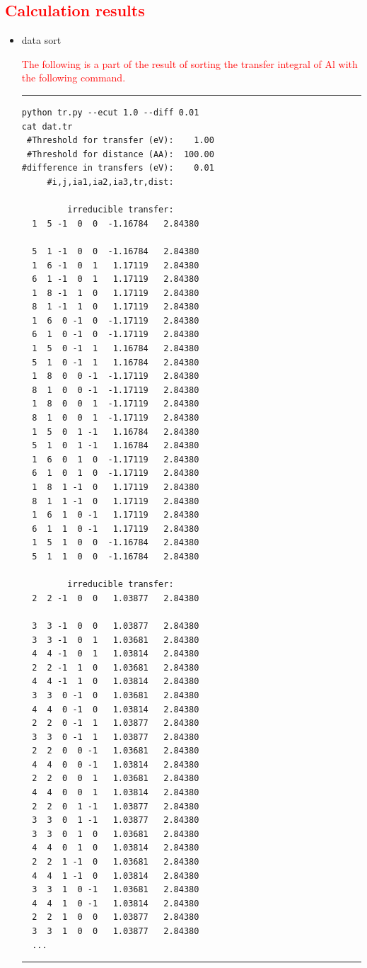 \documentclass{article}
\newcommand{\tr}[1]{\textcolor{red}{#1}}
\begin{document}
\subsection{\label{command}\tr{Calculation results}}

\begin{itemize}
\item{data sort}

\tr{The following is a part of the result of sorting the transfer integral of Al with the following command.}
\vspace{3mm}\hrule
\begin{multicols}{2}
\begin{verbatim}
python tr.py --ecut 1.0 --diff 0.01
cat dat.tr 
 #Threshold for transfer (eV):    1.00
 #Threshold for distance (AA):  100.00
#difference in transfers (eV):    0.01
     #i,j,ia1,ia2,ia3,tr,dist:

         irreducible transfer:
  1  5 -1  0  0  -1.16784   2.84380

  5  1 -1  0  0  -1.16784   2.84380
  1  6 -1  0  1   1.17119   2.84380
  6  1 -1  0  1   1.17119   2.84380
  1  8 -1  1  0   1.17119   2.84380
  8  1 -1  1  0   1.17119   2.84380
  1  6  0 -1  0  -1.17119   2.84380
  6  1  0 -1  0  -1.17119   2.84380
  1  5  0 -1  1   1.16784   2.84380
  5  1  0 -1  1   1.16784   2.84380
  1  8  0  0 -1  -1.17119   2.84380
  8  1  0  0 -1  -1.17119   2.84380
  1  8  0  0  1  -1.17119   2.84380
  8  1  0  0  1  -1.17119   2.84380
  1  5  0  1 -1   1.16784   2.84380
  5  1  0  1 -1   1.16784   2.84380
  1  6  0  1  0  -1.17119   2.84380
  6  1  0  1  0  -1.17119   2.84380
  1  8  1 -1  0   1.17119   2.84380
  8  1  1 -1  0   1.17119   2.84380
  1  6  1  0 -1   1.17119   2.84380
  6  1  1  0 -1   1.17119   2.84380
  1  5  1  0  0  -1.16784   2.84380
  5  1  1  0  0  -1.16784   2.84380

         irreducible transfer:
  2  2 -1  0  0   1.03877   2.84380

  3  3 -1  0  0   1.03877   2.84380
  3  3 -1  0  1   1.03681   2.84380
  4  4 -1  0  1   1.03814   2.84380
  2  2 -1  1  0   1.03681   2.84380
  4  4 -1  1  0   1.03814   2.84380
  3  3  0 -1  0   1.03681   2.84380
  4  4  0 -1  0   1.03814   2.84380
  2  2  0 -1  1   1.03877   2.84380
  3  3  0 -1  1   1.03877   2.84380
  2  2  0  0 -1   1.03681   2.84380
  4  4  0  0 -1   1.03814   2.84380
  2  2  0  0  1   1.03681   2.84380
  4  4  0  0  1   1.03814   2.84380
  2  2  0  1 -1   1.03877   2.84380
  3  3  0  1 -1   1.03877   2.84380
  3  3  0  1  0   1.03681   2.84380
  4  4  0  1  0   1.03814   2.84380
  2  2  1 -1  0   1.03681   2.84380
  4  4  1 -1  0   1.03814   2.84380
  3  3  1  0 -1   1.03681   2.84380
  4  4  1  0 -1   1.03814   2.84380
  2  2  1  0  0   1.03877   2.84380
  3  3  1  0  0   1.03877   2.84380
  ...
\end{verbatim}
\end{multicols}
\hrule\vspace{3mm}


\end{itemize}
\end{document}
